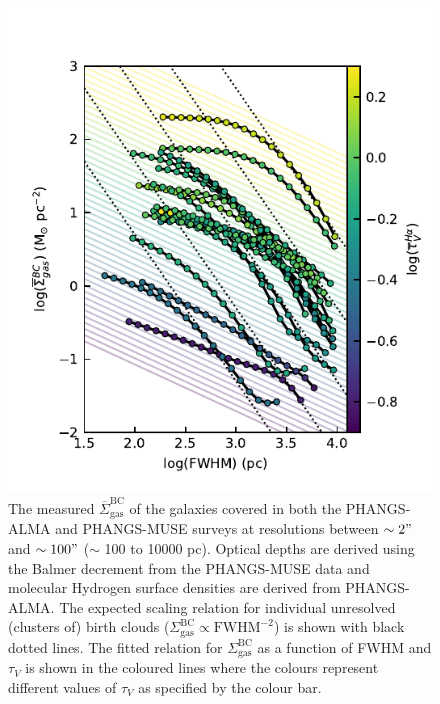 \documentclass[fleqn,usenatbib]{mnras}
\begin{document}
\begin{figure}
    \centering
    \includegraphics[width=\columnwidth]{figures/fig7.pdf}
    \caption{The measured $\overline{\Sigma}_{\textrm{gas}}^{\textrm{BC}}$ of the galaxies covered in both the PHANGS-ALMA and PHANGS-MUSE surveys at resolutions between $\sim2"$ and $\sim100"$ ($\sim$ 100 to 10000 pc). Optical depths are derived using the Balmer decrement from the PHANGS-MUSE data and molecular Hydrogen surface densities are derived from PHANGS-ALMA. The expected scaling relation for individual unresolved (clusters of) birth clouds ($\Sigma_{\textrm{gas}}^{\textrm{BC}} \propto \textrm{FWHM}^{-2}$) is shown with black dotted lines. The fitted relation for $\Sigma_{\textrm{gas}}^{\textrm{BC}}$ as a function of FWHM and $\tau_V$ is shown in the coloured lines where the colours represent different values of $\tau_V$ as specified by the colour bar.}
    \label{fig:Excess_SD_dependence_resolution_tau}
\end{figure}
\end{document}
